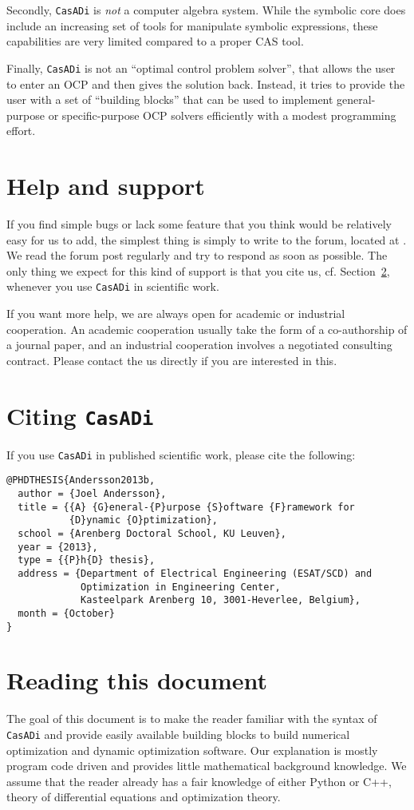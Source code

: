 \documentclass[a4paper,12pt]{book}
\newcommand{\CasADi}{\texttt{CasADi}\xspace}
\begin{document}
Secondly, \CasADi is \emph{not} a computer algebra system. While the symbolic core does include an increasing set of tools for manipulate symbolic expressions, these capabilities are very limited compared to a proper CAS tool.

Finally, \CasADi is not an ``optimal control problem solver'', that allows the user to enter an OCP and then gives the solution back. Instead, it tries to provide the user with a set of ``building blocks'' that can be used to implement general-purpose or specific-purpose OCP solvers efficiently with a modest programming effort.

\section{Help and support} \label{sec:support}
If you find simple bugs or lack some feature that you think would be relatively easy for us to add, the simplest thing is simply to write to the forum, located at . We read the forum post regularly and try to respond as soon as possible. The only thing we expect for this kind of support is that you cite us, cf. Section~\ref{sec:citing}, whenever you use \CasADi in scientific work.

If you want more help, we are always open for academic or industrial cooperation. An academic cooperation usually take the form of a co-authorship of a journal paper, and an industrial cooperation involves a negotiated consulting contract. Please contact the us directly if you are interested in this.

\section{Citing \CasADi} \label{sec:citing}
If you use \CasADi in published scientific work, please cite the following:
\begin{verbatim}
@PHDTHESIS{Andersson2013b,
  author = {Joel Andersson},
  title = {{A} {G}eneral-{P}urpose {S}oftware {F}ramework for 
           {D}ynamic {O}ptimization},
  school = {Arenberg Doctoral School, KU Leuven},
  year = {2013},
  type = {{P}h{D} thesis},
  address = {Department of Electrical Engineering (ESAT/SCD) and 
             Optimization in Engineering Center,
             Kasteelpark Arenberg 10, 3001-Heverlee, Belgium},
  month = {October}
}
\end{verbatim}

\section{Reading this document}
The goal of this document is to make the reader familiar with the syntax of \CasADi and provide easily available building blocks to build numerical optimization and dynamic optimization software. Our explanation is mostly program code driven and provides little mathematical background knowledge. We assume that the reader already has a fair knowledge of either Python or C++, theory of differential equations and optimization theory. 
\end{document}
